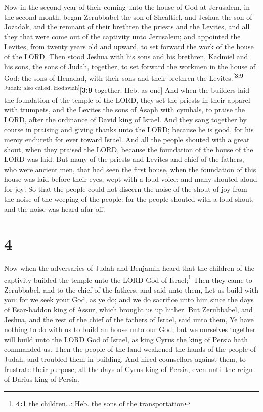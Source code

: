  Now in the second year of their coming unto the house of
God at Jerusalem, in the second month, began Zerubbabel the son of
Shealtiel, and Jeshua the son of Jozadak, and the remnant of their
brethren the priests and the Levites, and all they that were come out of
the captivity unto Jerusalem; and appointed the Levites, from twenty
years old and upward, to set forward the work of the house of the LORD.
 Then stood Jeshua with his sons and his brethren, Kadmiel
and his sons, the sons of Judah, together, to set forward the workmen in
the house of God: the sons of Henadad, with their sons and their
brethren the Levites.\textsuperscript{{[}\textbf{3:9} Judah: also
called, Hodaviah{]}}{[}\textbf{3:9} together: Heb. as one{]}
 And when the builders laid the foundation of the temple
of the LORD, they set the priests in their apparel with trumpets, and
the Levites the sons of Asaph with cymbals, to praise the LORD, after
the ordinance of David king of Israel.  And they sang
together by course in praising and giving thanks unto the LORD; because
he is good, for his mercy endureth for ever toward Israel. And all the
people shouted with a great shout, when they praised the LORD, because
the foundation of the house of the LORD was laid.  But
many of the priests and Levites and chief of the fathers, who were
ancient men, that had seen the first house, when the foundation of this
house was laid before their eyes, wept with a loud voice; and many
shouted aloud for joy:  So that the people could not
discern the noise of the shout of joy from the noise of the weeping of
the people: for the people shouted with a loud shout, and the noise was
heard afar off.

\hypertarget{section-3}{%
\section{4}\label{section-3}}

 Now when the adversaries of Judah and Benjamin heard that
the children of the captivity builded the temple unto the LORD God of
Israel;\footnote{\textbf{4:1} the children\ldots: Heb. the sons of the
  transportation}  Then they came to Zerubbabel, and to
the chief of the fathers, and said unto them, Let us build with you: for
we seek your God, as ye do; and we do sacrifice unto him since the days
of Esar-haddon king of Assur, which brought us up hither. 
But Zerubbabel, and Jeshua, and the rest of the chief of the fathers of
Israel, said unto them, Ye have nothing to do with us to build an house
unto our God; but we ourselves together will build unto the LORD God of
Israel, as king Cyrus the king of Persia hath commanded us.
 Then the people of the land weakened the hands of the
people of Judah, and troubled them in building,  And hired
counsellors against them, to frustrate their purpose, all the days of
Cyrus king of Persia, even until the reign of Darius king of Persia.

